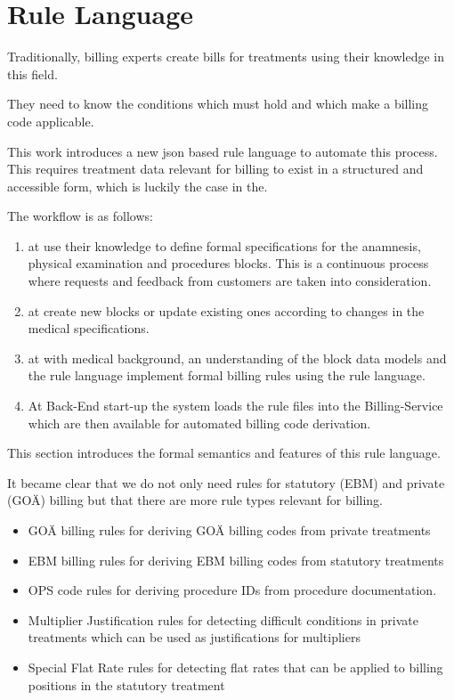 \section{Rule Language}\label{sec:rule-language}

Traditionally, billing experts create bills for treatments using their knowledge in this field.

They need to know the conditions which must hold and which make a billing code applicable.

This work introduces a new json based rule language to automate this process.
This requires treatment data relevant for billing to exist in a structured and accessible form,
which is luckily the case in the\AVS.

The workflow is as follows:
\begin{enumerate}
    \item \Me
    at \AV use their knowledge to define formal specifications for the anamnesis,
    physical examination and procedures blocks.
    This is a continuous process where requests and feedback from customers are taken into consideration.
    \item \Se at \AV create new blocks or update existing ones according to changes in the medical specifications.
    \item \Be at \AV with medical background,
    an understanding of the block data models and the rule language implement formal billing rules
    using the rule language.
    \item At Back-End start-up the system loads the rule files into the Billing-Service which are then available for automated billing code derivation.
\end{enumerate}


This section introduces the formal semantics and features of this rule language.

It became clear that we do not only need rules for statutory (EBM) and private
(GOÄ) billing but that there are more rule types relevant for billing.

\begin{itemize}
    \item GOÄ billing rules for deriving GOÄ billing codes from private treatments
    \item EBM billing rules for deriving EBM billing codes from statutory treatments
    \item OPS code rules for deriving procedure IDs from procedure documentation.
    \item Multiplier Justification rules for detecting difficult conditions in private treatments which can be used as justifications for multipliers
    \item Special Flat Rate rules for detecting flat rates that can be applied to billing positions in the statutory treatment
\end{itemize}

